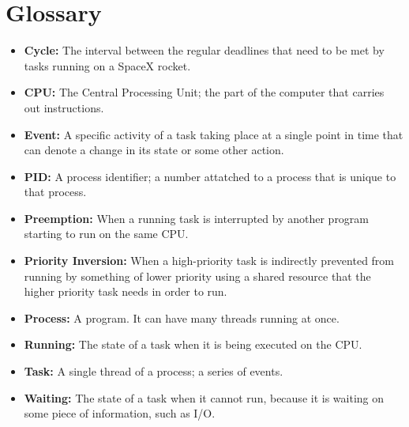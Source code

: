 \documentclass{hmcclinic}
\begin{document}
\newpage
\section{Glossary}
\begin{itemize}[ ]
\item {\bf Cycle:} The interval between the regular deadlines that need to be
  met by tasks running on a SpaceX rocket.
\item {\bf CPU:} The Central Processing Unit; the part of the computer that carries out instructions.
\item{\bf Event:} A specific activity of a task taking place at a single point in time that can denote a change in its state or some other action.
\item {\bf PID:} A process identifier; a number attatched to a process that is unique to that process.
\item {\bf Preemption:} When a running task is interrupted by another program starting to run on the same CPU. 
\item {\bf Priority Inversion:} When a high-priority task is indirectly
  prevented from running by something of
lower priority using a shared resource that the higher priority task needs in
order to run. 
\item{\bf Process:} A program. It can have many threads running at once.
\item {\bf Running:} The state of a task when it is being executed on the CPU.
\item {\bf Task:} A single thread of a process; a series of events.
\item {\bf Waiting:} The state of a task when it cannot run, because it is waiting 
  on some piece of information, such as I/O.
\end{itemize}

\newpage
\end{document}
